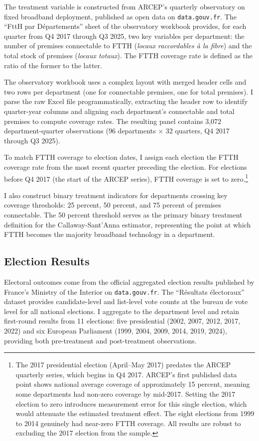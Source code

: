 \documentclass[12pt]{article}
\begin{document}
The treatment variable is constructed from ARCEP's quarterly observatory on fixed broadband deployment, published as open data on \texttt{data.gouv.fr}. The ``FttH par D\'epartements'' sheet of the observatory workbook provides, for each quarter from Q4 2017 through Q3 2025, two key variables per department: the number of premises connectable to FTTH (\emph{locaux raccordables \`a la fibre}) and the total stock of premises (\emph{locaux totaux}). The FTTH coverage rate is defined as the ratio of the former to the latter.

The observatory workbook uses a complex layout with merged header cells and two rows per department (one for connectable premises, one for total premises). I parse the raw Excel file programmatically, extracting the header row to identify quarter-year columns and aligning each department's connectable and total premises to compute coverage rates. The resulting panel contains 3,072 department-quarter observations (96 departments $\times$ 32 quarters, Q4 2017 through Q3 2025).

To match FTTH coverage to election dates, I assign each election the FTTH coverage rate from the most recent quarter preceding the election. For elections before Q4 2017 (the start of the ARCEP series), FTTH coverage is set to zero.\footnote{The 2017 presidential election (April--May 2017) predates the ARCEP quarterly series, which begins in Q4 2017. ARCEP's first published data point shows national average coverage of approximately 15 percent, meaning some departments had non-zero coverage by mid-2017. Setting the 2017 election to zero introduces measurement error for this single election, which would attenuate the estimated treatment effect. The eight elections from 1999 to 2014 genuinely had near-zero FTTH coverage. All results are robust to excluding the 2017 election from the sample.}

I also construct binary treatment indicators for departments crossing key coverage thresholds: 25 percent, 50 percent, and 75 percent of premises connectable. The 50 percent threshold serves as the primary binary treatment definition for the Callaway-Sant'Anna estimator, representing the point at which FTTH becomes the majority broadband technology in a department.

\subsection{Election Results}

Electoral outcomes come from the official aggregated election results published by France's Ministry of the Interior on \texttt{data.gouv.fr}. The ``R\'esultats \'electoraux'' dataset provides candidate-level and list-level vote counts at the bureau de vote level for all national elections. I aggregate to the department level and retain first-round results from 11 elections: five presidential (2002, 2007, 2012, 2017, 2022) and six European Parliament (1999, 2004, 2009, 2014, 2019, 2024), providing both pre-treatment and post-treatment observations.
\end{document}
